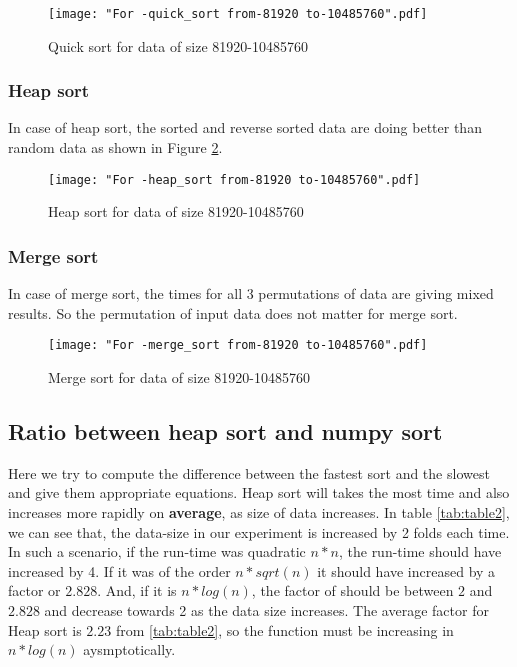 \documentclass[sigconf, nonacm, natbib, screen, balance=False]{acmart}
\begin{document}
\begin{figure}[ht]
\texttt{[image: "For -quick\_sort from-81920 to-10485760".pdf]}
    \caption{Quick sort for data of size 81920-10485760 }
    \label{fig:quicksort}
\end{figure}

\subsubsection{Heap sort}
In case of heap sort, the sorted and reverse sorted data are doing better than random data as shown in Figure \ref{fig:heapsort}.
\begin{figure}[ht]
\texttt{[image: "For -heap\_sort from-81920 to-10485760".pdf]}
    \caption{Heap sort for data of size 81920-10485760 }
    \label{fig:heapsort}
\end{figure}

\subsubsection{Merge sort}
In case of merge sort, the times for all 3 permutations of data are giving mixed results. So the permutation of input data does not matter for merge sort.

\begin{figure}[ht]
\texttt{[image: "For -merge\_sort from-81920 to-10485760".pdf]}
    \caption{Merge sort for data of size 81920-10485760 }
    \label{fig:mergesort}
\end{figure}


\subsection{Ratio between heap sort and numpy sort}\label{math}
Here we try to compute the difference between the fastest sort and the slowest and give them appropriate equations. Heap sort will takes the most time and also increases more rapidly on \textbf{average}, as size of data increases. In table \ref{tab:table2}, we can see that, the data-size in our experiment is increased by 2 folds each time. In such a scenario, if the run-time was quadratic $n*n$, the run-time should have increased by 4. If it was of the order $n*sqrt(n)$ it should have increased by a factor or $2.828$. And, if it is $n*log(n)$, the factor of should be between $2$ and $2.828$ and decrease towards 2 as the data size increases. The average factor for Heap sort is $2.23$ from \ref{tab:table2}, so the function must be increasing in $n*log(n)$ aysmptotically. 
\end{document}
